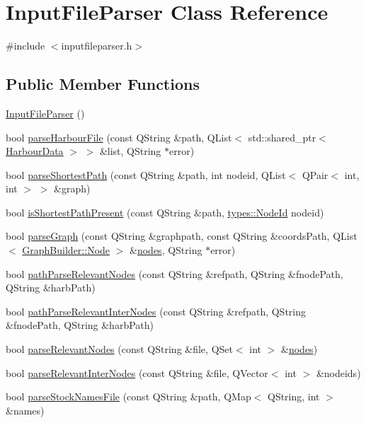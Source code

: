 \hypertarget{class_input_file_parser}{}\section{Input\+File\+Parser Class Reference}
\label{class_input_file_parser}


{\ttfamily \#include $<$inputfileparser.\+h$>$}

\subsection*{Public Member Functions}
\begin{DoxyCompactItemize}
\item 
\mbox{\hyperlink{class_input_file_parser_a7235f2dc37c08ecc5b8ffbd7a9c38b63}{Input\+File\+Parser}} ()
\item 
bool \mbox{\hyperlink{class_input_file_parser_a707a7dab7ad1d7aa3da6f25b2ce41d48}{parse\+Harbour\+File}} (const Q\+String \&path, Q\+List$<$ std\+::shared\+\_\+ptr$<$ \mbox{\hyperlink{class_harbour_data}{Harbour\+Data}} $>$ $>$ \&list, Q\+String $\ast$error)
\item 
bool \mbox{\hyperlink{class_input_file_parser_a8bc5aa995e3259f3ad09003316ae6533}{parse\+Shortest\+Path}} (const Q\+String \&path, int nodeid, Q\+List$<$ Q\+Pair$<$ int, int $>$ $>$ \&graph)
\item 
bool \mbox{\hyperlink{class_input_file_parser_a05314529d0ec1dcea25c5bc558438845}{is\+Shortest\+Path\+Present}} (const Q\+String \&path, \mbox{\hyperlink{classtypes_1_1_node_id}{types\+::\+Node\+Id}} nodeid)
\item 
bool \mbox{\hyperlink{class_input_file_parser_a4ba538032394832a80a3b837b3c8ba9a}{parse\+Graph}} (const Q\+String \&graphpath, const Q\+String \&coords\+Path, Q\+List$<$ \mbox{\hyperlink{class_graph_builder_1_1_node}{Graph\+Builder\+::\+Node}} $>$ \&\mbox{\hyperlink{thread__vessels_8cpp_ace5675146c8515428d094fd142d8a2d2}{nodes}}, Q\+String $\ast$error)
\item 
bool \mbox{\hyperlink{class_input_file_parser_a140a7650651f70f31a3a58538facd8f5}{path\+Parse\+Relevant\+Nodes}} (const Q\+String \&refpath, Q\+String \&fnode\+Path, Q\+String \&harb\+Path)
\item 
bool \mbox{\hyperlink{class_input_file_parser_a9fdb282b6eb601148bfda85edf1c0ca3}{path\+Parse\+Relevant\+Inter\+Nodes}} (const Q\+String \&refpath, Q\+String \&fnode\+Path, Q\+String \&harb\+Path)
\item 
bool \mbox{\hyperlink{class_input_file_parser_aa2be819bdc5012f0c3f1e63d27b2a1bf}{parse\+Relevant\+Nodes}} (const Q\+String \&file, Q\+Set$<$ int $>$ \&\mbox{\hyperlink{thread__vessels_8cpp_ace5675146c8515428d094fd142d8a2d2}{nodes}})
\item 
bool \mbox{\hyperlink{class_input_file_parser_a72c61d399c4a239b2d8a76a5cdfbbc5a}{parse\+Relevant\+Inter\+Nodes}} (const Q\+String \&file, Q\+Vector$<$ int $>$ \&nodeids)
\item 
bool \mbox{\hyperlink{class_input_file_parser_ae2073f6d4a7791b757a170d5f1fbfad2}{parse\+Stock\+Names\+File}} (const Q\+String \&path, Q\+Map$<$ Q\+String, int $>$ \&names)
\end{DoxyCompactItemize}


